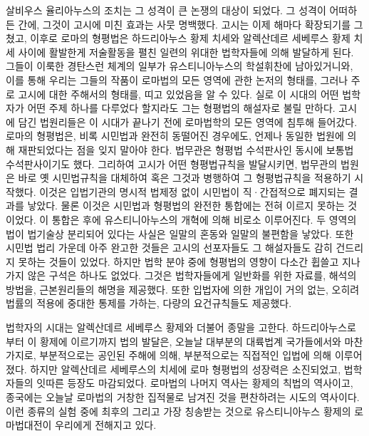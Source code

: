 살비우스 율리아누스의 조치는 그 성격이 큰 논쟁의 대상이 되었다.
그 성격이 어떠하든 간에, 그것이 고시에 미친 효과는 사뭇 명백했다.
고시는 이제 해마다 확장되기를 그쳤고, 이후로
로마의 형평법은 하드리아누스 황제 치세와 알렉산데르 세베루스 황제 치세 사이에
활발한게 저술활동을 펼친 일련의 위대한 법학자들에 의해 발달하게 된다.
그들이 이룩한 경탄스런 체계의 일부가
유스티니아누스의 학설휘찬에
남아있거니와, 이를 통해 우리는 그들의 작품이 로마법의 모든 영역에 관한
논저의 형태를,
그러나 주로 고시에 대한 주해서의 형태를, 띠고 있었음을 알 수 있다.
실로 이 시대의 어떤 법학자가 어떤 주제 하나를 다루었다 할지라도
그는 형평법의 해설자로 불릴 만하다.
고시에 담긴 법원리들은 이 시대가 끝나기 전에 로마법학의 모든 영역에
침투해 들어갔다.
로마의 형평법은, 비록 시민법과 완전히 동떨어진 경우에도,
언제나 동일한 법원에 의해 재판되었다는 점을 잊지 말아야 한다.
법무관은 형평법 수석판사인 동시에 보통법 수석판사이기도 했다.
그리하여 고시가 어떤 형평법규칙을 발달시키면,
법무관의 법원은 바로 옛 시민법규칙을 대체하여 혹은 그것과 병행하여
그 형평법규칙을 적용하기 시작했다. 이것은
입법기관의 명시적 법제정 없이 시민법이 직^^b7간접적으로 폐지되는 결과를 낳았다.
물론 이것은 시민법과 형평법의 완전한 통합에는 전혀 이르지 못하는 것이었다.
이 통합은 후에 유스티니아누스의 개혁에 의해 비로소 이루어진다.
두 영역의 법이 법기술상 분리되어 있다는 사실은
일말의 혼동와 일말의 불편함을 낳았다. 또한
시민법 법리 가운데 아주 완고한 것들은 고시의 선포자들도 그 해설자들도
감히 건드리지 못하는 것들이 있었다.
하지만 법학 분야 중에
형평법의 영향이 다소간 휩쓸고 지나가지 않은 구석은 하나도 없었다.
그것은 법학자들에게 일반화를 위한 자료를,
해석의 방법을, 근본원리들의 해명을 제공했다. 또한
입법자에 의한 개입이 거의 없는,
오히려 법률의 적용에 중대한 통제를 가하는,
다량의 요건규칙들도 제공했다.

법학자의 시대는 알렉산데르 세베루스 황제와 더불어 종말을 고한다.
하드리아누스로부터 이 황제에 이르기까지 법의 발달은,
오늘날 대부분의 대륙법계 국가들에서와 마찬가지로,
부분적으로는 공인된 주해에 의해,
부분적으로는 직접적인 입법에 의해 이루어졌다.
하지만 알렉산데르 세베루스의 치세에 로마 형평법의 성장력은 소진되었고,
법학자들의 잇따른 등장도 마감되었다.
로마법의 나머지 역사는 황제의 칙법의 역사이고,
종국에는 오늘날 로마법의 거창한 집적물로 남겨진 것을 편찬하려는
시도의 역사이다.
이런 종류의 실험 중에 최후의 그리고 가장 칭송받는 것으로
유스티니아누스 황제의 로마법대전이 우리에게 전해지고 있다.

